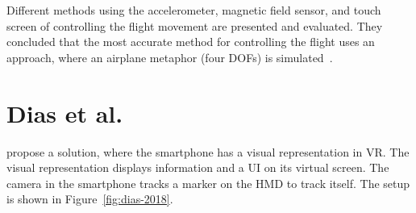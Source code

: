 Different methods using the accelerometer, magnetic field sensor, and touch screen of controlling the flight movement are presented and evaluated. They concluded that the most accurate method for controlling the flight uses an approach, where an airplane metaphor (four \acp{DOF}) is simulated~\cite{Benzina.2011}.


\section{Dias et al.}\label{section:dias-2018}
\citeauthor{Dias.2018} propose a solution, where the smartphone has a visual representation in \ac{VR}. The visual representation displays information and a \ac{UI} on its virtual screen. The camera in the smartphone tracks a marker on the \ac{HMD} to track itself. The setup is shown in Figure~\ref{fig:dias-2018}. 

